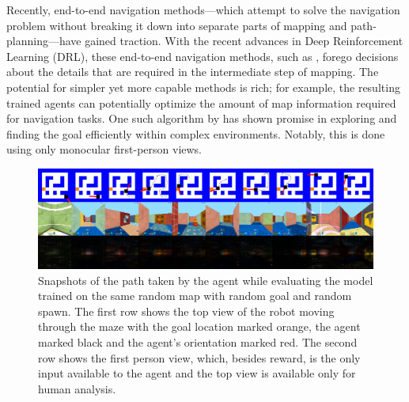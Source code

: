 Recently, end-to-end navigation methods---which attempt to  
solve the navigation problem without breaking it down into separate parts of mapping and path-planning---have gained traction.
%
With the recent advances in Deep Reinforcement Learning (DRL), these end-to-end navigation methods, such as \cite{MnBaMiICML2016,SiHuMaNATURE2016,LePaKrISER2017,MiPaViICLR2017,OhChSiICML2016}, forego decisions about the details that are required in the intermediate step of mapping.
The potential for simpler yet more capable methods is rich; for example, the resulting trained agents can potentially optimize the amount of map information required for navigation tasks.
One such algorithm by \cite{MiPaViICLR2017} has shown promise in exploring and finding the goal efficiently within complex environments. Notably, this is done using only monocular first-person views.

\begin{figure}
\includegraphics[width=\textwidth,trim=0 336pt 0 0,clip]{./exp-results/training-09x09-0127-on-0127.png}%
\caption{
Snapshots of the path taken by the agent while evaluating the model trained on the same random map with random goal and random spawn.
The first row shows the top view of the robot moving through the maze with the goal location marked orange, the agent marked black and the agent's orientation marked red. The second row shows the first person view, which, besides reward, is the only input available to the agent and the top view is available only for human analysis.}
\label{fig:training-qualitative}
\end{figure}

